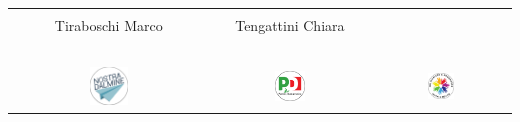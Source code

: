 \begin{center}
\begin{tabular}{ccc}
    \\\\
    Tiraboschi Marco
    &
    Tengattini Chiara
    &
    
    \\\\
    \\\\
    \\\\
    \hspace{\constabsep}
    \includegraphics[width=0.2\textwidth]{img/ndlogo}
    \hspace{\constabsep}
    &
    \hspace{\constabsep}
    \includegraphics[width=0.2\textwidth]{img/pdlogo}
    \hspace{\constabsep}
    &
    \hspace{\constabsep}
    \includegraphics[width=0.2\textwidth]{img/splogo}
    \hspace{\constabsep}
  \end{tabular}
\end{center}
\twocolumn
